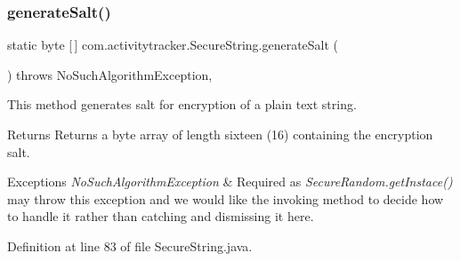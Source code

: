 \subsubsection{\texorpdfstring{generateSalt()}{generateSalt()}}
{\footnotesize\ttfamily static byte \mbox{[}$\,$\mbox{]} com.\+activitytracker.\+Secure\+String.\+generate\+Salt (\begin{DoxyParamCaption}{ }\end{DoxyParamCaption}) throws No\+Such\+Algorithm\+Exception\hspace{0.3cm}{\ttfamily [static]}, {\ttfamily [private]}}

This method generates salt for encryption of a plain text string.

\begin{DoxyReturn}{Returns}
Returns a byte array of length sixteen (16) containing the encryption salt.
\end{DoxyReturn}

\begin{DoxyExceptions}{Exceptions}
{\em No\+Such\+Algorithm\+Exception} & Required as {\itshape Secure\+Random.\+get\+Instace()} may throw this exception and we would like the invoking method to decide how to handle it rather than catching and dismissing it here. \\
\hline
\end{DoxyExceptions}


Definition at line 83 of file Secure\+String.\+java.


\begin{DoxyCode}{0}

\end{DoxyCode}
\mbox{\label{classcom_1_1activitytracker_1_1_secure_string_aa2521591ab15fb4c5a2461c04b08320f}} 
